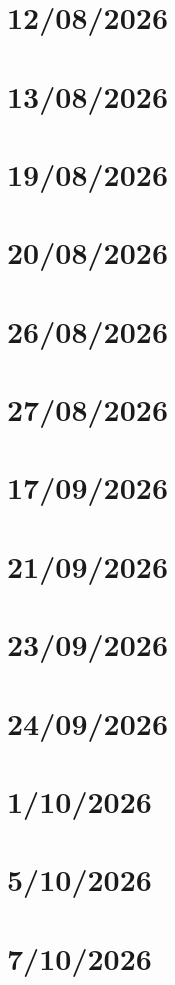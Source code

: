 \chapter{12/08/2026}

\chapter{13/08/2026}

\chapter{19/08/2026}

\chapter{20/08/2026}

\chapter{26/08/2026}

\chapter{27/08/2026}

\chapter{17/09/2026}

\chapter{21/09/2026}

\chapter{23/09/2026}

\chapter{24/09/2026}

\chapter{1/10/2026}

\chapter{5/10/2026}

\chapter{7/10/2026}

